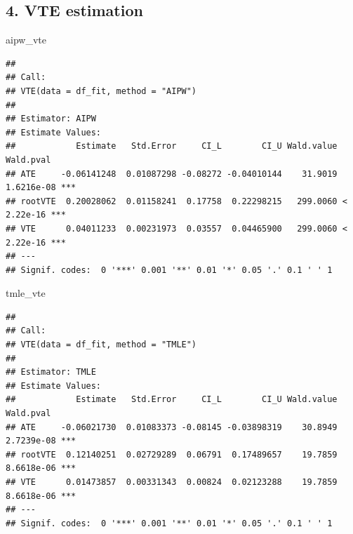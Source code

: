 \documentclass[
]{article}
\newenvironment{Shaded}{\begin{snugshade}}{\end{snugshade}}
\newcommand{\AttributeTok}[1]{\textcolor[rgb]{0.77,0.63,0.00}{#1}}
\newcommand{\CommentTok}[1]{\textcolor[rgb]{0.56,0.35,0.01}{\textit{#1}}}
\newcommand{\FunctionTok}[1]{\textcolor[rgb]{0.00,0.00,0.00}{#1}}
\newcommand{\NormalTok}[1]{#1}
\newcommand{\OtherTok}[1]{\textcolor[rgb]{0.56,0.35,0.01}{#1}}
\newcommand{\StringTok}[1]{\textcolor[rgb]{0.31,0.60,0.02}{#1}}
\begin{document}
\hypertarget{vte-estimation}{%
\subsection{4. VTE estimation}\label{vte-estimation}}

\begin{Shaded}
\end{Shaded}

\begin{Shaded}
\begin{Highlighting}[]
\NormalTok{aipw\_vte}
\end{Highlighting}
\end{Shaded}

\begin{verbatim}
## 
## Call:
## VTE(data = df_fit, method = "AIPW")
## 
## Estimator: AIPW
## Estimate Values:
##            Estimate   Std.Error     CI_L        CI_U Wald.value  Wald.pval    
## ATE     -0.06141248  0.01087298 -0.08272 -0.04010144    31.9019 1.6216e-08 ***
## rootVTE  0.20028062  0.01158241  0.17758  0.22298215   299.0060 < 2.22e-16 ***
## VTE      0.04011233  0.00231973  0.03557  0.04465900   299.0060 < 2.22e-16 ***
## ---
## Signif. codes:  0 '***' 0.001 '**' 0.01 '*' 0.05 '.' 0.1 ' ' 1
\end{verbatim}

\begin{Shaded}
\begin{Highlighting}[]
\NormalTok{tmle\_vte}
\end{Highlighting}
\end{Shaded}

\begin{verbatim}
## 
## Call:
## VTE(data = df_fit, method = "TMLE")
## 
## Estimator: TMLE
## Estimate Values:
##            Estimate   Std.Error     CI_L        CI_U Wald.value  Wald.pval    
## ATE     -0.06021730  0.01083373 -0.08145 -0.03898319    30.8949 2.7239e-08 ***
## rootVTE  0.12140251  0.02729289  0.06791  0.17489657    19.7859 8.6618e-06 ***
## VTE      0.01473857  0.00331343  0.00824  0.02123288    19.7859 8.6618e-06 ***
## ---
## Signif. codes:  0 '***' 0.001 '**' 0.01 '*' 0.05 '.' 0.1 ' ' 1
\end{verbatim}
\end{document}
